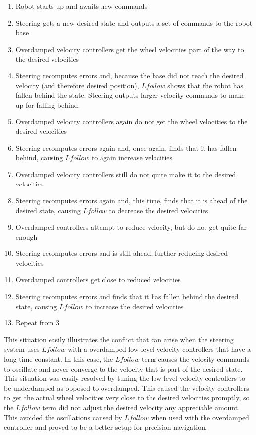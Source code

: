 \begin{enumerate}
\item Robot starts up and awaits new commands
\item Steering gets a new desired state and outputs a set of commands to the robot base
\item Overdamped velocity controllers get the wheel velocities part of the way to the desired velocities
\item Steering recomputes errors and, because the base did not reach the desired velocity (and therefore desired position), $Lfollow$ shows that the robot has fallen behind the state. Steering outputs larger velocity commands to make up for falling behind.
\item Overdamped velocity controllers again do not get the wheel velocities to the desired velocities
\item Steering recomputes errors again and, once again, finds that it has fallen behind, causing $Lfollow$ to again increase velocities
\item Overdamped velocity controllers still do not quite make it to the desired velocities
\item Steering recomputes errors again and, this time, finds that it is ahead of the desired state, causing $Lfollow$ to decrease the desired velocities
\item Overdamped controllers attempt to reduce velocity, but do not get quite far enough
\item Steering recomputes errors and is still ahead, further reducing desired velocities
\item Overdamped controllers get close to reduced velocities
\item Steering recomputes errors and finds that it has fallen behind the desired state, causing $Lfollow$ to increase the desired velocities
\item Repeat from 3
\end{enumerate}

This situation easily illustrates the conflict that can arise when the steering system uses $Lfollow$ with a overdamped low-level velocity controllers that have a long time constant. In this case, the $Lfollow$ term causes the velocity commands to oscillate and never converge to the velocity that is part of the desired state. This situation was easily resolved by tuning the low-level velocity controllers to be underdamped as opposed to overdamped. This caused the velocity controllers to get the actual wheel velocities very close to the desired velocities promptly, so the $Lfollow$ term did not adjust the desired velocity any appreciable amount. This avoided the oscillations caused by $Lfollow$ when used with the overdamped controller and proved to be a better setup for precision navigation.


